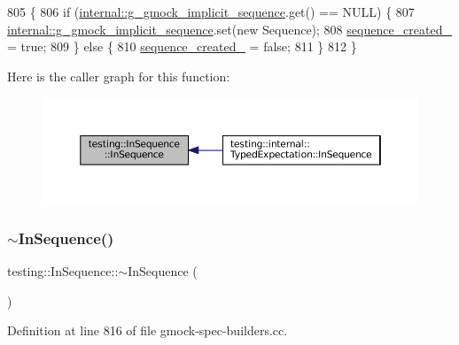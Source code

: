 \begin{DoxyCode}
805                        \{
806   \textcolor{keywordflow}{if} (\hyperlink{namespacetesting_1_1internal_af4407fe8aeb1e43b2f58940736a20590}{internal::g\_gmock\_implicit\_sequence}.\textcolor{keyword}{get}() == NULL) \{
807     \hyperlink{namespacetesting_1_1internal_af4407fe8aeb1e43b2f58940736a20590}{internal::g\_gmock\_implicit\_sequence}.set(\textcolor{keyword}{new} Sequence);
808     \hyperlink{classtesting_1_1InSequence_ae8a5805923f65001454a83f344f9292c}{sequence\_created\_} = \textcolor{keyword}{true};
809   \} \textcolor{keywordflow}{else} \{
810     \hyperlink{classtesting_1_1InSequence_ae8a5805923f65001454a83f344f9292c}{sequence\_created\_} = \textcolor{keyword}{false};
811   \}
812 \}
\end{DoxyCode}
Here is the caller graph for this function\+:
\nopagebreak
\begin{figure}[H]
\begin{center}
\leavevmode
\includegraphics[width=350pt]{classtesting_1_1InSequence_ac40a4ac3e4f26e088ebc09e543514b6b_icgraph}
\end{center}
\end{figure}
\mbox{\label{classtesting_1_1InSequence_afe11b11ccb5f55daea5f1e0a9a1af48f}} 
\subsubsection{\texorpdfstring{$\sim$\+In\+Sequence()}{~InSequence()}}
{\footnotesize\ttfamily testing\+::\+In\+Sequence\+::$\sim$\+In\+Sequence (\begin{DoxyParamCaption}{ }\end{DoxyParamCaption})}



Definition at line 816 of file gmock-\/spec-\/builders.\+cc.




